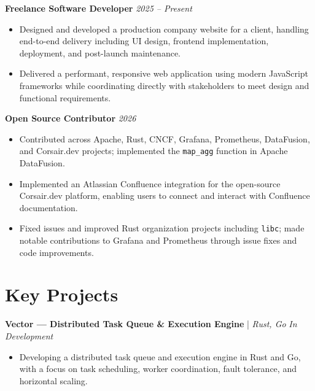 \documentclass[a4paper,9pt]{article}
\begin{document}
\textbf{Freelance Software Developer} \hfill \textit{2025 -- Present}

\begin{itemize}
    \item Designed and developed a production company website for a client, handling end-to-end delivery including UI design, frontend implementation, deployment, and post-launch maintenance.
    \item Delivered a performant, responsive web application using modern JavaScript frameworks while coordinating directly with stakeholders to meet design and functional requirements.
\end{itemize}

\vspace{1pt}

\textbf{Open Source Contributor} \hfill \textit{2026}

\begin{itemize}
    \item Contributed across Apache, Rust, CNCF, Grafana, Prometheus, DataFusion, and Corsair.dev projects; implemented the \texttt{map\_agg} function in Apache DataFusion.
    \item Implemented an Atlassian Confluence integration for the open-source Corsair.dev platform, enabling users to connect and interact with Confluence documentation.
    \item Fixed issues and improved Rust organization projects including \texttt{libc}; made notable contributions to Grafana and Prometheus through issue fixes and code improvements.
\end{itemize}

\section*{Key Projects}

\textbf{Vector --- Distributed Task Queue \& Execution Engine} | \textit{Rust, Go} \hfill \textit{In Development}

\begin{itemize}
    \item Developing a distributed task queue and execution engine in Rust and Go, with a focus on task scheduling, worker coordination, fault tolerance, and horizontal scaling.
\end{itemize}

\vspace{1pt}
\end{document}
